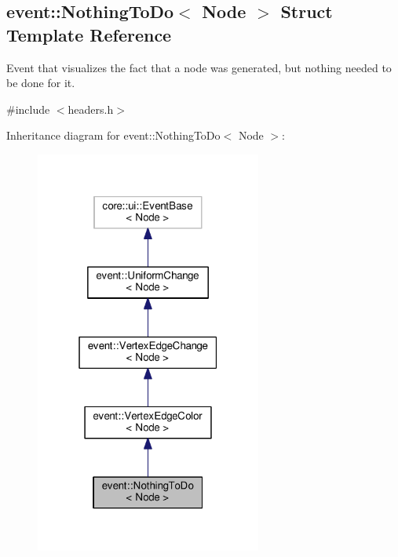 \hypertarget{structevent_1_1NothingToDo}{}\subsection{event\+:\+:Nothing\+To\+Do$<$ Node $>$ Struct Template Reference}
\label{structevent_1_1NothingToDo}


Event that visualizes the fact that a node was generated, but nothing needed to be done for it.  




{\ttfamily \#include $<$headers.\+h$>$}



Inheritance diagram for event\+:\+:Nothing\+To\+Do$<$ Node $>$\+:\nopagebreak
\begin{figure}[H]
\begin{center}
\leavevmode
\includegraphics[width=211pt]{structevent_1_1NothingToDo__inherit__graph}
\end{center}
\end{figure}


